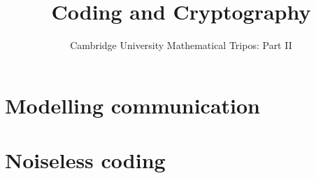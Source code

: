 \documentclass{article}
\title{Coding and Cryptography}
\author{Cambridge University Mathematical Tripos: Part II}
\begin{document}
\maketitle

\tableofcontentsnewpage{}

\section{Modelling communication}

\section{Noiseless coding}

\end{document}
